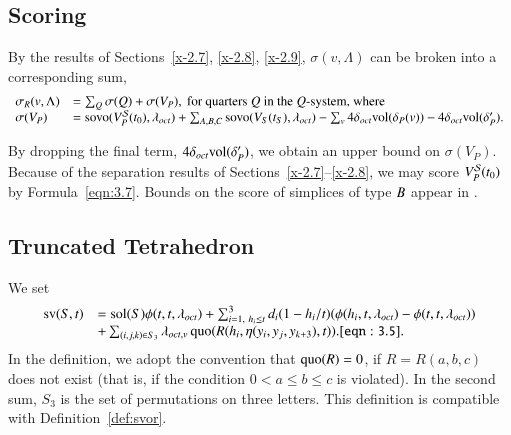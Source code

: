 \subsection{Scoring}

By the results of Sections~\ref{x-2.7}, \ref{x-2.8}, \ref{x-2.9},
$\sigma(v,\Lambda)$ can be broken into a corresponding sum,
    $$
    \begin{array}{lll}
    \sigma_R(v,\Lambda) &= \sum_Q \sigma(Q) + \sigma(V_P),
                \hbox{ for quarters $Q$ in the $Q$-system, where}\\
    \sigma(V_P) &= {\operatorname{sovo}}(V^{{\mathcal S}}_P(t_0),\lambda_{oct})+  \sum_{A,B,C} {\operatorname{sovo}}(V_S(t_S),\lambda_{oct})
        - \sum_v 4\delta_{oct}{\operatorname{vol}}(\delta_P(v)) - 4\delta_{oct}{\operatorname{vol}}(\delta'_P).\\
    \end{array}
    $$

By dropping the final term, $4\delta_{oct}{\operatorname{vol}}(\delta'_P)$, we obtain
an upper bound on $\sigma(V_P)$.  Because of the separation
results of Sections~\ref{x-2.7}--\ref{x-2.8},  we may score
$V^{{\mathcal S}}_P(t_0)$ by Formula~\ref{eqn:3.7}. Bounds on the score of
simplices of type $B$ appear in .



\subsection{Truncated Tetrahedron}


We set
    \begin{equation}
    \begin{array}{lll}
    \op{sv}(S,t) &=
    \sol(S)\phi(t,t,\lambda_{oct})
    +\sum_{i=1,\ h_i\le t}^3 d_i (1-h_i/t) (\phi(h_i,t,\lambda_{oct})-
    \phi(t,t,\lambda_{oct})) \\
    &+\sum_{(i,j,k)\in S_3}
    \lambda_{oct,v}
    \quo(R(h_i,\eta(y_i,y_j,y_{k+3}),t)).
    \tlabel{eqn:3.5}
    \end{array}
    \end{equation}
In the definition, we adopt the convention that $\operatorname{quo}(R)=0$, if
$R=R(a,b,c)$ does not exist (that is, if the condition
    $0< a\le b\le c$
is violated). In the second sum, $S_3$ is the set of permutations
on three letters. This definition is compatible with
Definition~\ref{def:svor}.

